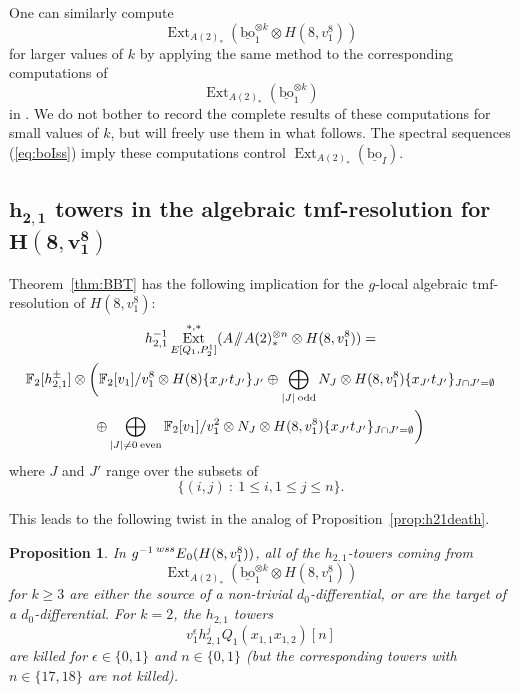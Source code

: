 \documentclass[10pt]{amsart}
\newcommand{\sslash}{\mathbin{/\mkern-6mu/}}
\newcommand{\mmod}{\! \sslash \!}
\newcommand{\ul}[1]{\underline{#1}}
\newcommand{\mr}[1]{\mathrm{#1}}
\newcommand{\abs}[1]{\lvert #1 \rvert}
\newcommand{\FF}{\mathbb{F}}
\newcommand{\tmf}{\mathrm{tmf}}
\newcommand{\bo}{\mathrm{bo}}
\newcommand{\bou}{\ul{\bo}}
\newtheorem{prop}[equation]{Proposition}
\theoremstyle{definition}
\numberwithin{equation}{section}
\numberwithin{figure}{section}
\DeclareMathOperator{\Ext}{Ext}
\newcommand{\E}[2]{\prescript{#1}{#2}{E}}
\begin{document}
One can similarly compute
$$ \Ext_{A(2)_*}(\bou_1^{\otimes k} \otimes H(8,v_1^8)) $$
for larger values of $k$ by applying the same method to the corresponding computations of 
$$ \Ext_{A(2)_*}(\bou_1^{\otimes k}) $$
in \cite{BHHM}.  We do not bother to record the complete results of these computations for small values of $k$, but will freely use them in what follows.  The spectral sequences (\ref{eq:boIss}) imply these computations control $\Ext_{A(2)_*}(\bou_I)$.


\subsection*{$\pmb{h_{2,1}}$ towers in the algebraic tmf-resolution for $\pmb{H(8,v_1^8)}$}

Theorem~\ref{thm:BBT} has the following implication for the $g$-local algebraic $\tmf$-resolution of $H(8,v_1^8)$:
\begin{multline*} 
h_{2,1}^{-1}\Ext^{*,*}_{E[Q_1,P_2^1]}(A \mmod A(2)_*^{\otimes n} \otimes H(8,v_1^8)) = \\
\FF_2[h_{2,1}^{\pm}] \otimes \bigg( \FF_2[v_1]/v_1^8\otimes H(8)\{x_{J'}t_{J'}\}_{J'} \oplus 
\bigoplus_{\abs{J} \: \mr{odd}} N_J \otimes H(8,v_1^8)\{x_{J'}t_{J'}\}_{J \cap J' = \emptyset} \\
\oplus \bigoplus_{\abs{J} \ne 0 \: \mr{even}}
\FF_2[v_1]/v_1^2 \otimes N_J \otimes H(8,v_1^8)\{x_{J'}t_{J'}\}_{J \cap J' = \emptyset} \bigg)
\end{multline*}
where $J$ and $J'$ range over the subsets of
$$ \{ (i,j) \: : \: 1 \le i, 1 \le j \le n \}. $$ 

This leads to the following twist in the analog of Proposition~\ref{prop:h21death}.

\begin{prop}\label{prop:h21deathH38}
In $g^{-1}\E{wss}{}_0(H(8,v_1^8))$, all of the $h_{2,1}$-towers coming from $$\Ext_{A(2)_*}(\bou_1^{\otimes k} \otimes H(8,v_1^8))$$ 
for $k \ge 3$ are either the source of a non-trivial $d_0$-differential, or are the target of a $d_0$-differential.  For $k = 2$, the $h_{2,1}$ towers
$$ v_1^\epsilon h^j_{2,1}Q_1(x_{1,1}x_{1,2})[n] $$
are  killed for $\epsilon \in \{0,1\}$ and $n \in \{0,1\}$ (but the corresponding towers with $n \in \{17,18\}$ are \emph{not} killed).
\end{prop}
\end{document}
